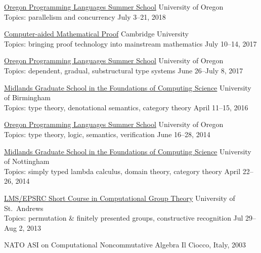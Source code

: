 \newcommand\ssitem[5]{\href{#1}{#2} \hfill #3 \\ Topics: #4 \hfill #5}

\ssitem
    {https://www.cs.uoregon.edu/research/summerschool/summer18/topics.php}
    {Oregon Programming Languages Summer School}
    {University of Oregon}
    {parallelism and concurrency}
    {July 3--21, 2018}

    \vspace{-3mm}

\ssitem
    {https://www.newton.ac.uk/event/bprw01}
    {Computer-aided Mathematical Proof}
    {Cambridge University}
    {bringing proof technology into mainstream mathematics}
    {July 10--14, 2017}
    
    \vspace{-3mm}

    \ssitem
    {https://www.cs.uoregon.edu/research/summerschool/summer17}
    {Oregon Programming Languages Summer School}
    {University of Oregon}
    {dependent, gradual, substructural type systems}
    {June 26--July 8, 2017}

    \vspace{-3mm}
    
\ssitem
    {http://www.cs.bham.ac.uk/~pbl/mgs2016/}
    {Midlands Graduate School in the Foundations of Computing Science}
    {University of Birmingham}
    {type theory, denotational semantics, category theory}
    {April 11--15, 2016}

    \vspace{-3mm}

    \ssitem
    {https://www.cs.uoregon.edu/research/summerschool/summer14/curriculum.html}
    {Oregon Programming Languages Summer School}
    {University of Oregon}
    {type theory, logic, semantics, verification}
    {June 16--28, 2014}

    \vspace{-3mm}

\ssitem
    {http://www.cs.nott.ac.uk/~psztxa/mgs.2014/}
    {Midlands Graduate School in the Foundations of Computing Science}
    { University of Nottingham }
    {simply typed lambda calculus, domain theory, category theory}
    {April 22--26, 2014}

    \vspace{-3mm}

\ssitem
    {http://www-circa.mcs.st-and.ac.uk/cgt2013/}
    {LMS/EPSRC Short Course in Computational Group Theory}
    {University of St.~Andrews}
    {permutation \& finitely presented groups, constructive recognition}
    {Jul 29--Aug 2, 2013}

    \vspace{-3mm}

    NATO  ASI on Computational Noncommutative Algebra
           \hfill Il Ciocco, Italy, 2003 
